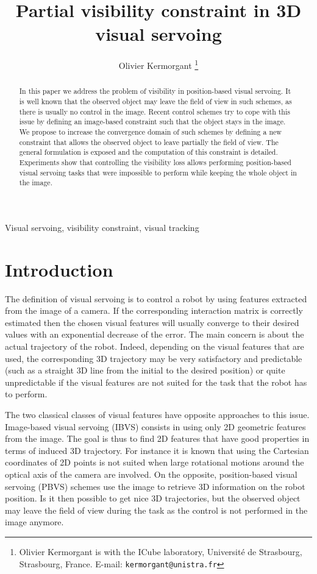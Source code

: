 \documentclass[letterpaper, 10 pt, conference]{IEEEtran}  %
\title{\LARGE \bf Partial visibility constraint in 3D visual servoing}
\author{Olivier Kermorgant
  \thanks{Olivier Kermorgant is with the ICube laboratory, Université de Strasbourg, Strasbourg, France.\newline
	E-mail: {\tt\small kermorgant@unistra.fr}}
}
\begin{document}
\maketitle

\thispagestyle{empty}
\pagestyle{empty}


\begin{abstract}
In this paper we address the problem of visibility in position-based visual servoing.
It is well known that the observed object may leave the field of view in such schemes, as there is usually no control in the image.
Recent control schemes try to cope with this issue by defining an image-based constraint such that the object stays in the image.
We propose to increase the convergence domain of such schemes by defining a new constraint that allows the observed object to leave partially the field of view. 
The general formulation is exposed and the computation of this constraint is detailed.
Experiments show that controlling the visibility loss allows performing position-based visual servoing tasks that were impossible to perform while keeping the whole object in the image. 
\end{abstract}
\begin{keywords}
  Visual servoing, visibility constraint, visual tracking
\end{keywords}


\section{Introduction}

The definition of visual servoing is to control a robot by using features extracted from the image of a camera.
If the corresponding interaction matrix is correctly estimated \cite{2006_mra_chaumette} then the chosen visual features will usually converge to their desired values with an exponential decrease of the error.
The main concern is about the actual trajectory of the robot. Indeed, depending on the visual features that are used, the corresponding 3D trajectory may be very satisfactory and predictable (such as a straight 3D line from the initial to the desired position) or quite unpredictable if the visual features are not suited for the task that the robot has to perform. 

The two classical classes of visual features have opposite approaches to this issue.
Image-based visual servoing (IBVS) consists in using only 2D geometric features from the image. The goal is thus to find 2D features that have good properties in terms of induced 3D trajectory. For instance it is known that using the Cartesian coordinates of 2D points is not suited when large rotational motions around the optical axis of the camera are involved.
On the opposite, position-based visual servoing  (PBVS) schemes use the image to retrieve 3D information on the robot position. Is it then possible to get nice 3D trajectories, but the observed object may leave the field of view during the task as the control is not performed in the image anymore.
\end{document}
